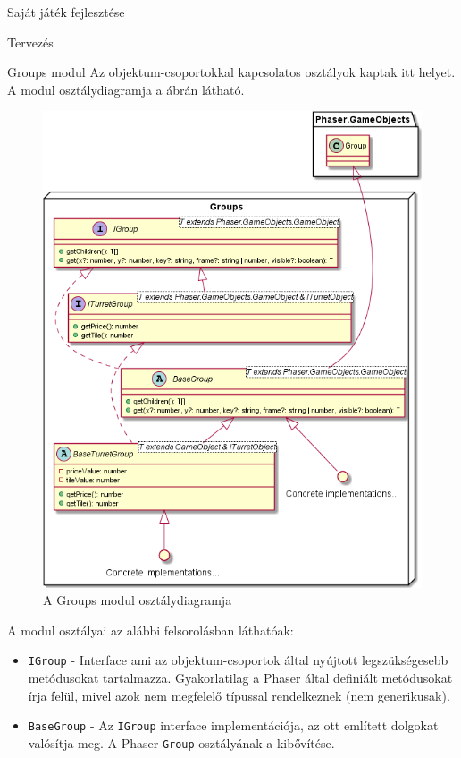\begin{MyChapter}{Saját játék fejlesztése}
\begin{MySection}{Tervezés}
		\begin{MySubSection}{Groups modul}
			Az objektum-csoportokkal kapcsolatos osztályok kaptak itt helyet.
			A modul osztálydiagramja a  ábrán látható.
	
			\begin{figure}[h!]
				\centering
				\includegraphics[width=1\textwidth]{kepek/uml/groups/group-pt1.png}
				\caption{A Groups modul osztálydiagramja}
				\label{fig:uml:group}
			\end{figure}
			
			A modul osztályai az alábbi felsorolásban láthatóak:
			\begin{itemize}
				\item \texttt{IGroup} - Interface ami az objektum-csoportok által nyújtott legszükségesebb metódusokat tartalmazza. Gyakorlatilag a Phaser által definiált metódusokat írja felül, mivel azok nem megfelelő típussal rendelkeznek (nem generikusak).
				
				\item \texttt{BaseGroup} - Az \texttt{IGroup} interface implementációja, az ott említett dolgokat valósítja meg. A Phaser \texttt{Group} osztályának a kibővítése.
				

\end{itemize}
\end{MySubSection}
\end{MySection}
\end{MyChapter}
